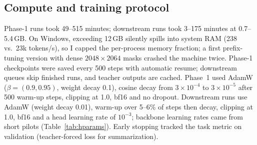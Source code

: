 \documentclass[11pt, oneside]{article}
\begin{document}
\subsection{Compute and training protocol}
Phase-1 runs took 49--515 minutes; downstream runs took 3--175 minutes at 0.7--5.4\,GB. On Windows, exceeding 12\,GB
silently spills into system RAM (238 vs.\ 23k tokens/s), so I capped the per-process memory fraction; a first
prefix-tuning version with dense $2048\times2064$ masks crashed the machine twice. Phase-1 checkpoints were saved every
500 steps with automatic resume; downstream queues skip finished runs, and teacher outputs are cached. Phase~1 used
AdamW ($\beta=(0.9,0.95)$, weight decay 0.1), cosine decay from $3\times10^{-4}$ to $3\times10^{-5}$ after 500 warm-up
steps, clipping at 1.0, bf16 and no dropout. Downstream runs use AdamW (weight decay 0.01), warm-up over 5--6\% of steps
then decay, clipping at 1.0, bf16 and a head learning rate of $10^{-3}$; backbone learning rates came from short pilots
(Table~\ref{tab:hparams}). Early stopping tracked the task metric on validation (teacher-forced loss for summarization).

\begin{table}[t]
\centering
\caption{Hyperparameters of the final model in each phase (P2: best single model; P4: the KD student in the
ensemble). Trainable parameters in parentheses.}
\label{tab:hparams}
\end{table}
\end{document}
